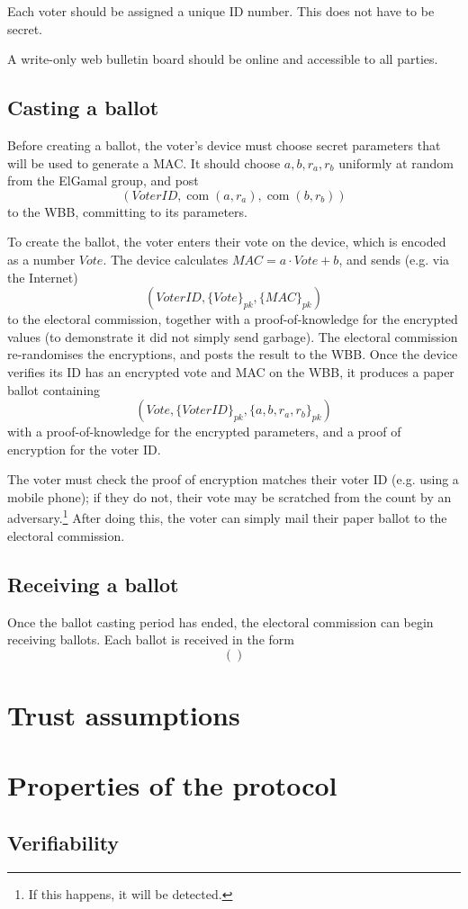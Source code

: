 \documentclass[11pt,twoside,a4paper]{article}
\DeclareMathOperator{\com}{com}
\theoremstyle{definition}
\begin{document}
Each voter should be assigned a unique ID number. This does not have to be secret.

A write-only web bulletin board should be online and accessible to all parties.
\subsection{Casting a ballot}
Before creating a ballot, the voter's device must choose secret parameters that will be used to generate a MAC. It should choose \(a,b,r_a,r_b\) uniformly at random from the ElGamal group, and post \[(VoterID,\com(a,r_a),\com(b,r_b))\] to the WBB, committing to its parameters.

To create the ballot, the voter enters their vote on the device, which is encoded as a number \(Vote\). The device calculates \(MAC=a\cdot Vote+b\), and sends (e.g. via the Internet)
\[(VoterID,\{Vote\}_{pk},\{MAC\}_{pk})\]
to the electoral commission, together with a proof-of-knowledge for the encrypted values (to demonstrate it did not simply send garbage). The electoral commission re-randomises the encryptions, and posts the result to the WBB. Once the device verifies its ID has an encrypted vote and MAC on the WBB, it produces a paper ballot containing
\[(Vote,\{VoterID\}_{pk},\{a,b,r_a,r_b\}_{pk})\]
with a proof-of-knowledge for the encrypted parameters, and a proof of encryption for the voter ID.

The voter must check the proof of encryption matches their voter ID (e.g. using a mobile phone); if they do not, their vote may be scratched from the count by an adversary.\footnote{If this happens, it will be detected.} After doing this, the voter can simply mail their paper ballot to the electoral commission.
\subsection{Receiving a ballot}
Once the ballot casting period has ended, the electoral commission can begin receiving ballots. Each ballot is received in the form
\[()\]
\section{Trust assumptions}
\section{Properties of the protocol}\label{sec-properties}
\subsection{Verifiability}
\end{document}
